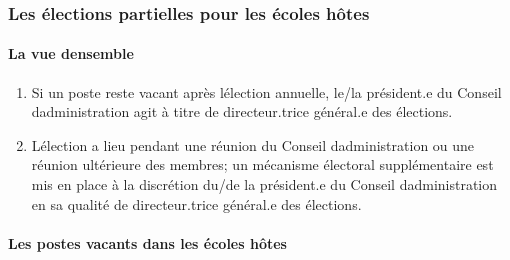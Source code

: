 \subsubsection{Les élections partielles pour les écoles hôtes}
\label{les-elections-partielles-pour-les-ecoles-hotes}

\paragraph{La vue d\textquotesingle ensemble}\label{la-vue-densemble-1}

\begin{enumerate}
 \item
  Si un poste reste vacant après l\textquotesingle élection annuelle, le/la président.e du Conseil d\textquotesingle administration agit à titre de directeur.trice général.e des élections.
 \item
  L\textquotesingle élection a lieu pendant une réunion du Conseil d\textquotesingle administration ou une réunion ultérieure des membres; un mécanisme électoral supplémentaire est mis en place à la discrétion du/de la président.e du Conseil d\textquotesingle administration en sa qualité de directeur.trice général.e des élections.
\end{enumerate}

\paragraph{Les postes vacants dans les écoles hôtes}\label{les-postes-vacants-dans-les-ecoles-hotes}

